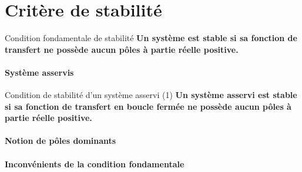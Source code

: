 \section{Critère de stabilité}

\begin{criteria}{Condition fondamentale de stabilité}
    \textbf{Un système est stable si sa fonction de transfert ne possède aucun pôles à partie réelle positive.}
\end{criteria}



\paragraph{Système asservis}
\begin{criteria}{Condition de stabilité d'un système asservi (1)}
    \textbf{Un système asservi est stable si sa fonction de transfert en boucle fermée 
    ne possède aucun pôles à partie réelle positive.}
\end{criteria}


\paragraph{Notion de pôles dominants}

\paragraph{Inconvénients de la condition fondamentale}

